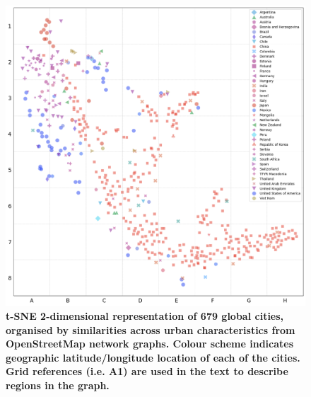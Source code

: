 \documentclass[preprint,10pt]{elsarticle} %
\begin{document}
\begin{figure}
\centering
\includegraphics[trim={ 0 0 0 0 },clip,scale=0.45]{Images/ByCountry_latlong_Zeigler_2.png}%
\caption{\bf t-SNE 2-dimensional representation of 679 global cities, organised by similarities across urban characteristics from OpenStreetMap network graphs. Colour scheme indicates geographic latitude/longitude location\cite{Jackle2017} of each of the cities. Grid references (i.e. A1) are used in the text to describe regions in the graph.}
 \label{fig:tSNE}
\end{figure}
\end{document}

